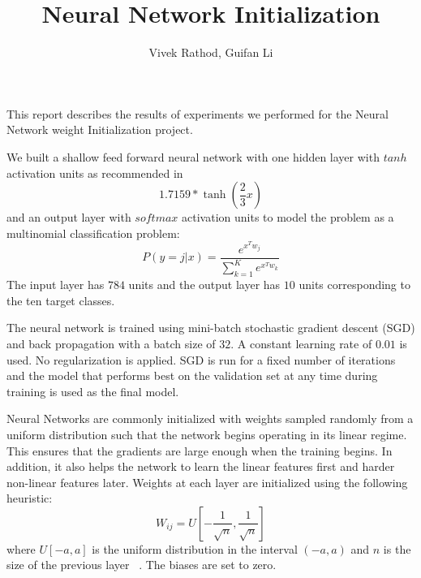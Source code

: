 \documentclass[Proceedings]{ascelike}
\begin{document}
%
\title{Neural Network Initialization}
%
\author{ Vivek Rathod, Guifan Li }
%
\maketitle
%

 This report describes the results of experiments we
performed for the Neural Network weight Initialization project.

 \label{sec:network_struct} We built a
shallow feed forward neural network with one hidden layer with $tanh$
activation units as recommended in \cite{lecun2012efficient}
\[1.7159*\tanh\left(\frac{2}{3}x\right)\] and an output layer with $softmax$
activation units to model the problem as a multinomial classification
problem:\[P(y=j|x)=\frac{e^{x^{T}w_j}}{\sum_{k=1}^Ke^{x^{T}w_k}}\] The input
layer has $784$ units and the output layer has $10$ units corresponding to the
ten target classes.

 \label{sec:train_method} The neural network is
trained using mini-batch stochastic gradient descent (SGD) and back propagation
with a batch size of $32$. A constant learning rate of $0.01$ is used. No
regularization is applied. SGD is run for a fixed number of iterations and the
model that performs best on the validation set at any time during training is
used as the final model. 

 \label{sec:weight_init} Neural Networks are
commonly initialized with weights sampled randomly from a uniform distribution
such that the network begins operating in its linear regime. This ensures that
the gradients are large enough when the training begins. In addition, it also
helps the network to learn the linear features first and harder non-linear
features later. Weights at each layer are initialized using the following
heuristic: \[W_{ij} = U\left[-\frac{1}{\sqrt{n}},\frac{1}{\sqrt{n}}\right]\]
where $U[-a, a]$ is the uniform distribution in the interval $(-a, a)$ and $n$
is the size of the previous layer ~\cite{erhan2009difficulty}. The biases are
set to zero.
\end{document}

